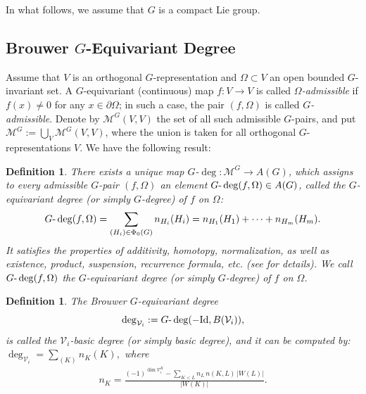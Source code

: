 \documentclass{amsart}%
\newtheorem{definition}[theorem]{Definition}
\def\cV{\mathcal V}
\def\id{\text{\rm Id}}
\begin{document}
In what follows, we assume that $G$ is a compact Lie group.

\subsection{Brouwer $G$-Equivariant Degree}
Assume that \texorpdfstring{$V$}{V} is an orthogonal $G$-representation and $\Omega\subset V$ an
open bounded $G$-invariant set. A $G$-equivariant (continuous) map $f:V\to V$
is called \textit{$\Omega$-admissible} if $f(x)\neq0$ for any $x\in
\partial\Omega$; in such a case, the pair $(f,\Omega)$ is called
\textit{$G$-admissible}. Denote by $\mathcal{M}^{G}(V,V)$ the set of all such
admissible $G$-pairs, and put $\mathcal{M}^{G}:=\bigcup_{V}\mathcal{M}
^{G}(V,V)$, where the union is taken for all orthogonal $G$-representations
$V$. We have the following result:

\begin{definition}
\label{thm:GpropDeg} There exists a unique map $G$-$\deg:\mathcal{M}^{G}\to
A(G)$, which assigns to every admissible $G$-pair $(f,\Omega)$ an element
$G\mbox{\rm -}\deg(f,\Omega)\in A(G)$, called the \textit{$G$-equivariant
degree} (or simply \textit{$G$-degree}) of $f$ on $\Omega$:
\begin{equation}
\label{eq:G-deg0}G\mbox{\rm -}\deg(f,\Omega)=\sum_{(H_{i})\in\Phi_{0}
(G)}n_{H_{i}}(H_{i})= n_{H_{1}}(H_{1})+\dots+n_{H_{m}}(H_{m}).
\end{equation}
It satisfies the properties of additivity, homotopy, normalization, as well as existence, product, suspension, recurrence formula, etc. (see \cite{balanov2025degree} for details).
We call $G\mbox{\rm -}\deg(f,\Omega)$ the \textit{$G$-equivariant
degree} (or simply \textit{$G$-degree}) of $f$ on $\Omega$.
\end{definition}\vskip0.3cm
\begin{definition} The Brouwer $G$-equivariant degree
\begin{equation} \label{eq:basicdeg}
\deg_{\cV_i} := G\text{-}\deg(-\id, B(\cV_i)),
\end{equation}
is called the {\it $\cV_i$-basic degree} (or simply {\it basic degree}), and it can be computed by: $\deg_{\mathcal{V} _{i}}=\sum_{(K)}n_{K}(K),$
where
\begin{align}\label{eq:formula}
n_{K}=\frac{(-1)^{\dim\mathcal{V} _{i}^{K}}- \sum_{K<L}{n_{L}\, n(K,L)\, \left|  W(L)\right|  }}{\left|  W(K)\right|  }.
\end{align}
\end{definition}
\end{document}
